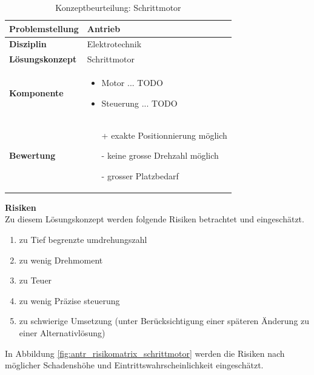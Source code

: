 \documentclass[../../main.tex]{subfiles}
\begin{document}
    \begin{flushleft}
        \begin{table}[H]
        \begin{tabular}{ | l | p{11cm} |}
        \hline
        \textbf{Problemstellung} & Antrieb \\ \hline
        \textbf{Disziplin} & Elektrotechnik \\ \hline
        \textbf{Lösungskonzept} & Schrittmotor\\ \hline
        \textbf{Komponente} & \begin{itemize}
            \item Motor ... TODO
            \item Steuerung ... TODO
            \end{itemize}\\ \hline
        \textbf{Bewertung} &  \begin{itemize} 
                                \item[+] exakte Positionnierung möglich
                                \item[-] keine grosse Drehzahl möglich
                                \item[-] grosser Platzbedarf
                              \end{itemize} \\ \hline
        \end{tabular}
        \caption{Konzeptbeurteilung: Schrittmotor}
        \label{tab:antr_konzept_schrittmotor}
    \end{table}
    \end{flushleft}
    

    \textbf{Risiken}\\
    Zu diesem Lösungskonzept werden folgende Risiken betrachtet und eingeschätzt.
    \begin{enumerate}[I]
        \item zu Tief begrenzte umdrehungszahl
        \item zu wenig Drehmoment
        \item zu Teuer
        \item zu wenig Präzise steuerung
        \item zu schwierige Umsetzung (unter Berücksichtigung einer späteren Änderung zu einer Alternativlösung)        
    \end{enumerate}

    In Abbildung \ref{fig:antr_risikomatrix_schrittmotor} werden die Risiken nach möglicher Schadenshöhe und Eintrittswahrscheinlichkeit eingeschätzt.
\end{document}
